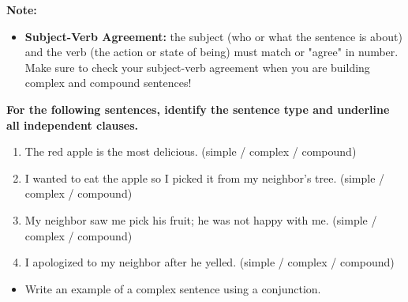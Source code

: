 \documentclass[12pt]{article}
\begin{document}
\vspace{1em}
\begin{tcolorbox}[colframe=black!40, colback=gray!5, 
coltitle=black, colbacktitle=black!20, fonttitle=\bfseries\Large, 
title=Additional Notes, halign title=center, left=5pt, right=5pt, top=5pt, bottom=15pt]
\textbf{Note:}
\begin{itemize}
    \item \textbf{Subject-Verb Agreement:} the subject (who or what the sentence is about) and the verb (the action or state of being) must match or "agree" in number. Make sure to check your subject-verb agreement when you are building complex and compound sentences!


\end{itemize}
\end{tcolorbox}

\vspace{1em}
\begin{tcolorbox}[colframe=black!60, colback=white, 
coltitle=black, colbacktitle=black!15, fonttitle=\bfseries\Large, 
title=Independent Practice, halign title=center, left=10pt, right=10pt, top=10pt, bottom=15pt]
\textbf{For the following sentences, identify the sentence type and underline all independent clauses.}
\begin{enumerate}[itemsep=3em] %
    \item The red apple is the most delicious.   (simple / complex / compound)
    \item   I wanted to eat the apple so I picked it from my neighbor's tree. (simple / complex / compound)
    \item My neighbor saw me pick his fruit; he was not happy with me. (simple / complex / compound)
    \item I apologized to my neighbor after he yelled. (simple / complex / compound)
\end{enumerate}
\end{tcolorbox}

\vspace{1em}

\begin{tcolorbox}[colframe=black!60, colback=white, 
coltitle=black, colbacktitle=black!15, fonttitle=\bfseries\Large, 
title=Exit Ticket, halign title=center, left=10pt, right=10pt, top=10pt, bottom=15pt]

\begin{itemize}
    \item Write an example of a complex sentence using a conjunction.
\vspace{2em}

     \underline{\hspace{14.6cm}}  
    \\[0.8cm] \underline{\hspace{14.6cm}}  
    \\[0.8cm] \underline{\hspace{14.6cm}}

\end{itemize}
\end{tcolorbox}
\end{document}
